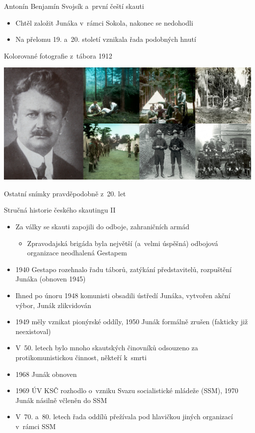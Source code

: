 \documentclass[compress, ucs, xelatex, xcolor=dvipsnames, print,
  hyperref={
    bookmarks=true,
    unicode=true,
    colorlinks=true,
    plainpages=false,
    pdfkeywords={Junak, Pedagogika, Skaut, Skauting, Vychovna metoda},
    linkcolor=Black,
    anchorcolor=Black,
    citecolor=OliveGreen,
    filecolor=OliveGreen,
    menucolor=Black,
    urlcolor=OliveGreen,
    pdftex}
  ]{beamer}
\begin{document}
\begin{frame}{Antonín Benjamín Svojsík a~první čeští skauti}
  \begin{itemize}
    \item Chtěl založit Junáka v~rámci Sokola, nakonec se nedohodli
    \item Na přelomu 19. a~20. století vznikala řada podobných hnutí
  \end{itemize}
  \begin{flushright}
    Kolorované fotografie z~tábora 1912
  \end{flushright}
  \includegraphics[width=\textwidth]{svojsik_prvni_skauti.jpg}
  \begin{flushright}
    Ostatní snímky pravděpodobně z~20. let
  \end{flushright}
\end{frame}

\begin{frame}{Stručná historie českého skautingu II}
  \begin{itemize}
    \item Za války se skauti zapojili do odboje, zahraničních armád
    \begin{itemize}
      \item Zpravodajská brigáda byla největší (a~velmi úspěšná) odbojová organizace neodhalená Gestapem
    \end{itemize}
    \item 1940 Gestapo rozehnalo řadu táborů, zatýkání představitelů, rozpuštění Junáka (obnoven 1945)
    \item Ihned po únoru 1948 komunisti obsadili ústředí Junáka, vytvořen akční výbor, Junák zlikvidován
    \item 1949 měly vznikat pionýrské oddíly, 1950 Junák formálně zrušen (fakticky již neexistoval)
    \item V~50. letech bylo mnoho skautských činovníků odsouzeno za protikomunistickou činnost, někteří k~smrti
    \item 1968 Junák obnoven
    \item 1969 ÚV KSČ rozhodlo o~vzniku Svazu socialistické mládeže (SSM), 1970 Junák násilně včleněn do SSM
    \item V~70. a~80. letech řada oddílů přežívala pod hlavičkou jiných organizací v~rámci SSM
  \end{itemize}
\end{frame}
\end{document}
